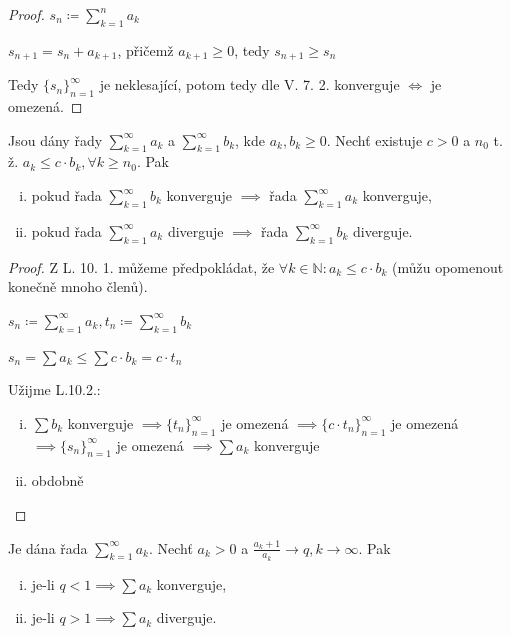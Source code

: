 \begin{proof}
  $s_n \coloneq \sum_{k=1}^{n} a_k$

  $s_{n+1} = s_n + a_{k+1}$, přičemž $a_{k+1} \geq 0$, tedy $s_{n+1} \geq s_n$

  Tedy $\{s_n\}_{n=1}^{\infty}$ je neklesající, potom tedy dle V. 7. 2. konverguje $\iff$ je omezená.
\end{proof}

\begin{veta}
  Jsou dány řady $\sum_{k=1}^{\infty} a_k$ a $\sum_{k=1}^{\infty} b_k$, kde $a_k, b_k \geq 0$. Nechť existuje $c>0$ a $n_0$ t. ž. $a_k \leq c\cdot b_k, \forall k \geq n_0$. Pak

  \begin{enumerate}[i)]
    \item pokud řada $\sum_{k=1}^\infty b_k$ konverguje $\implies$ řada $\sum_{k=1}^\infty a_k$ konverguje,
    \item pokud řada $\sum_{k=1}^\infty a_k$ diverguje $\implies$ řada $\sum_{k=1}^\infty b_k$ diverguje.
  \end{enumerate}
\end{veta}

\begin{proof}
  Z L. 10. 1. můžeme předpokládat, že $\forall k \in \mathbb N: a_k \leq c \cdot b_k$ (můžu opomenout konečně mnoho členů).

  $s_n \coloneq \sum_{k=1}^{\infty} a_k, t_n \coloneq \sum_{k=1}^{\infty} b_k$

  $s_n = \sum a_k \leq \sum c \cdot b_k = c \cdot t_n$

  Užijme L.10.2.:

  \begin{enumerate}[i)]
    \item $\sum b_k$ konverguje $\implies \{t_n\}_{n=1}^{\infty}$ je omezená $\implies \{c \cdot t_n\}_{n=1}^{\infty}$ je omezená $\implies \{s_n\}_{n=1}^{\infty}$ je omezená $\implies \sum a_k$ konverguje
    \item obdobně
  \end{enumerate}
\end{proof}

\begin{veta}
  Je dána řada $\sum_{k=1}^{\infty} a_k$. Nechť $a_k >0$ a $\frac{a_k+1}{a_k} \to q, k \to \infty$. Pak

  \begin{enumerate}[i)]
    \item je-li $q<1 \implies \sum a_k$ konverguje,
    \item je-li $q>1 \implies \sum a_k$ diverguje.
  \end{enumerate}
\end{veta}

